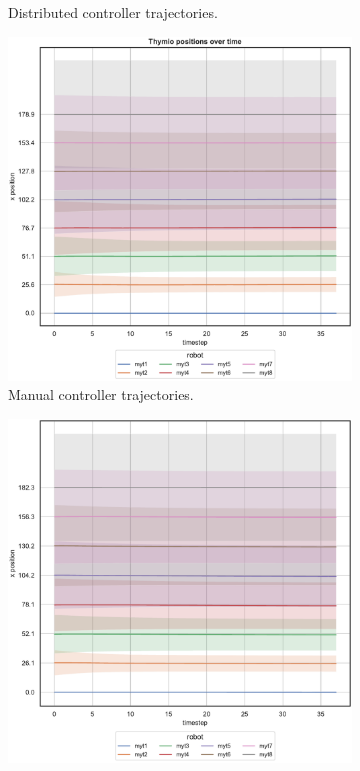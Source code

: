 \begin{figure}[!htb]
\begin{center}
\begin{subfigure}[h]{0.49\textwidth}
			\caption{Distributed controller trajectories.}
		\end{subfigure}
	\end{center}
	\begin{center}
		\begin{subfigure}[h]{0.49\textwidth}
			\centering			
			\includegraphics[width=.9\textwidth]{contents/images/net-d15/position-overtime-manual}%
			\caption{Manual controller trajectories.}
		\end{subfigure}
		\hfill
		\begin{subfigure}[h]{0.49\textwidth}
			\centering
			\includegraphics[width=.9\textwidth]{contents/images/net-c15/position-overtime-learned_communication}

\end{subfigure}
\end{center}
\end{figure}
